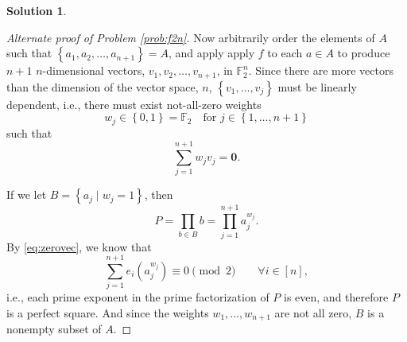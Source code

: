 \documentclass{article}
\theoremstyle{definition}
\newtheorem{sol}{Solution}
\theoremstyle{plain}
\newcommand{\set}[1]{\left\{#1\right\}}
\begin{document}
\begin{sol}
\begin{proof}[Alternate proof of Problem \ref{prob:f2n}]
Now arbitrarily order the elements of $A$ such that $\set{a_1,a_2,\dots,a_{n+1}} = A$, and apply apply $f$ to each $a \in A$ to produce $n+1$ $n$-dimensional vectors, $v_1,v_2,\dots,v_{n+1}$, in $\mathbb{F}_2^n$. Since there are more vectors than the dimension of the vector space, $n$, $\set{v_1,\dots,v_j}$ must be linearly dependent, i.e., there must exist not-all-zero weights
\[
w_j \in \set{0, 1} = \mathbb{F}_2 \quad \text{for $j \in \set{1, \dots, n+1}$}
\]
such that
\begin{equation}\label{eq:zerovec}
\sum_{j=1}^{n+1} w_j v_j = \mathbf{0}.
\end{equation}

If we let $B = \set{a_j \mid w_j = 1}$, then
\[
P = \prod_{b \in B} b = \prod_{j = 1}^{n+1}a_j^{w_j}.
\]
By \eqref{eq:zerovec}, we know that
\[
\sum_{j=1}^{n+1} e_i(a_j^{w_j}) \equiv 0 \pmod 2 \qquad \forall i \in [n],
\]
i.e., each prime exponent in the prime factorization of $P$ is even, and therefore $P$ is a perfect square. And since the weights $w_1,\dots,w_{n+1}$ are not all zero, $B$ is a nonempty subset of $A$.
\end{proof}
\end{sol}
\end{document}
